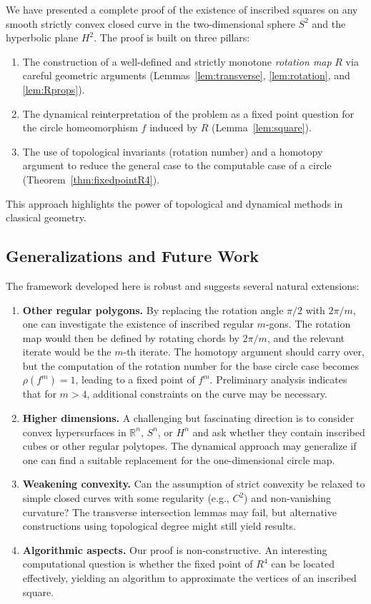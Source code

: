 \documentclass{article}
\begin{document}
We have presented a complete proof of the existence of inscribed squares on any smooth strictly convex closed curve in the two-dimensional sphere $S^2$ and the hyperbolic plane $H^2$. The proof is built on three pillars:
\begin{enumerate}
    \item The construction of a well-defined and strictly monotone \emph{rotation map} $R$ via careful geometric arguments (Lemmas~\ref{lem:transverse}, \ref{lem:rotation}, and \ref{lem:Rprops}).
    \item The dynamical reinterpretation of the problem as a fixed point question for the circle homeomorphism $f$ induced by $R$ (Lemma~\ref{lem:square}).
    \item The use of topological invariants (rotation number) and a homotopy argument to reduce the general case to the computable case of a circle (Theorem~\ref{thm:fixedpointR4}).
\end{enumerate}
This approach highlights the power of topological and dynamical methods in classical geometry.

\subsection*{Generalizations and Future Work}

The framework developed here is robust and suggests several natural extensions:

\begin{enumerate}
    \item \textbf{Other regular polygons.} By replacing the rotation angle $\pi/2$ with $2\pi/m$, one can investigate the existence of inscribed regular $m$-gons. The rotation map would then be defined by rotating chords by $2\pi/m$, and the relevant iterate would be the $m$-th iterate. The homotopy argument should carry over, but the computation of the rotation number for the base circle case becomes $\rho(f^m) = 1$, leading to a fixed point of $f^m$. Preliminary analysis indicates that for $m>4$, additional constraints on the curve may be necessary.

    \item \textbf{Higher dimensions.} A challenging but fascinating direction is to consider convex hypersurfaces in $\mathbb{R}^n$, $S^n$, or $H^n$ and ask whether they contain inscribed cubes or other regular polytopes. The dynamical approach may generalize if one can find a suitable replacement for the one-dimensional circle map.

    \item \textbf{Weakening convexity.} Can the assumption of strict convexity be relaxed to simple closed curves with some regularity (e.g., $C^2$) and non-vanishing curvature? The transverse intersection lemmas may fail, but alternative constructions using topological degree might still yield results.

    \item \textbf{Algorithmic aspects.} Our proof is non-constructive. An interesting computational question is whether the fixed point of $R^4$ can be located effectively, yielding an algorithm to approximate the vertices of an inscribed square.
\end{enumerate}
\end{document}
